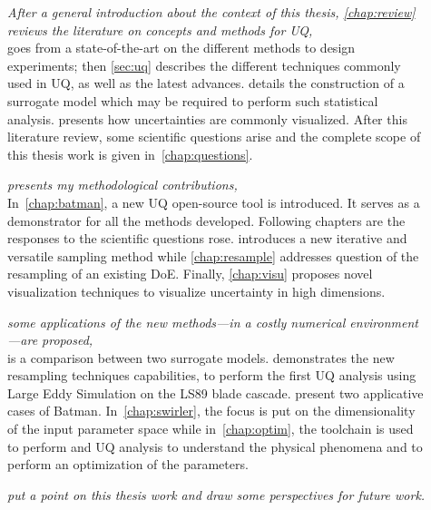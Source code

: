 \begin{description}
	\item[] \emph{After a general introduction about the context of this thesis,  \cref{chap:review} reviews the literature on concepts and methods for UQ,}\hfill\\
 goes from a state-of-the-art on the different methods to design experiments; then \cref{sec:uq} describes the different techniques commonly used in UQ, as well as the latest advances.  details the construction of a surrogate model which may be required to perform such statistical analysis.  presents how uncertainties are commonly visualized. After this literature review, some scientific questions arise and the complete scope of this thesis work is given in~\cref{chap:questions}.

	\item[] \emph{presents my methodological contributions,}\hfill\\
In~\cref{chap:batman}, a new UQ open-source tool is introduced. It serves as a demonstrator for all the methods developed. Following chapters are the responses to the scientific questions rose.  introduces a new iterative and versatile sampling method while \cref{chap:resample} addresses question of the resampling of an existing DoE. Finally, \cref{chap:visu} proposes novel visualization techniques to visualize uncertainty in high dimensions.

	\item[] \emph{some applications of the new methods---in a costly numerical environment---are proposed,}\hfill\\
 is a comparison between two surrogate models.  demonstrates the new resampling techniques capabilities, to perform the first UQ analysis using Large Eddy Simulation on the LS89 blade cascade.  present two applicative cases of Batman. In~\cref{chap:swirler}, the focus is put on the dimensionality of the input parameter space while in~\cref{chap:optim}, the toolchain is used to perform and UQ analysis to understand the physical phenomena and to perform an optimization of the parameters. %

	\item[] \emph{put a point on this thesis work and draw some perspectives for future work.}
\end{description}


